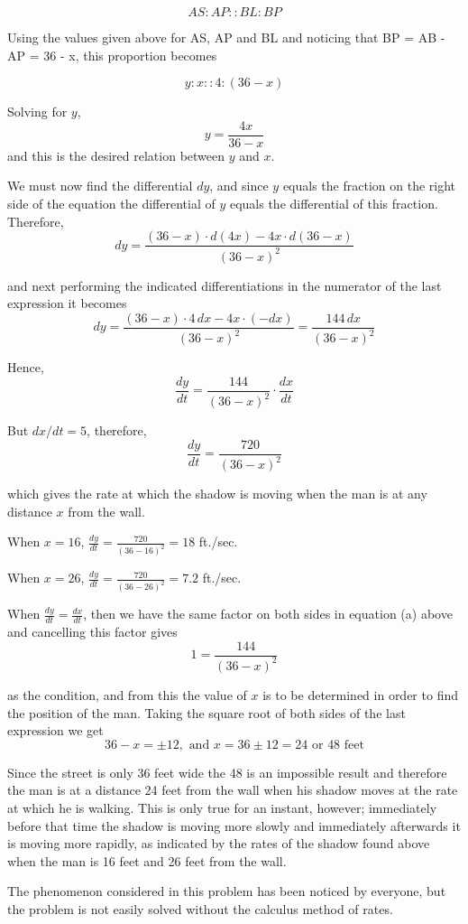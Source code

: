 \[AS : AP :: BL : BP\]

Using the values given above for AS, AP and BL and noticing that BP = AB - AP = 36 - x, this proportion becomes

\[y : x :: 4 : (36-x)\]

Solving for $y$,
\[y = \frac{4x}{36-x}\]
and this is the desired relation between $y$ and $x$.

We must now find the differential $dy$, and since $y$ equals the fraction on the right side of the equation the differential of $y$ equals the differential of this fraction. Therefore,
\[dy = \frac{(36-x)\cdot d(4x) - 4x\cdot d(36-x)}{(36-x)^2}\]

and next performing the indicated differentiations in the numerator of the last expression it becomes
\[dy = \frac{(36-x)\cdot 4\,dx - 4x\cdot(-dx)}{(36-x)^2} = \frac{144\,dx}{(36-x)^2}\]

Hence,
\[\frac{dy}{dt} = \frac{144}{(36-x)^2}\cdot\frac{dx}{dt}\]

But $dx/dt = 5$, therefore,
\[\frac{dy}{dt} = \frac{720}{(36-x)^2} \tag{a}\]

which gives the rate at which the shadow is moving when the man is at any distance $x$ from the wall.

When $x = 16$, $\frac{dy}{dt} = \frac{720}{(36-16)^2} = 18$ ft./sec.

When $x = 26$, $\frac{dy}{dt} = \frac{720}{(36-26)^2} = 7.2$ ft./sec.

When $\frac{dy}{dt} = \frac{dx}{dt}$, then we have the same factor on both sides in equation (a) above and cancelling this factor gives
\[1 = \frac{144}{(36-x)^2}\]

as the condition, and from this the value of $x$ is to be determined in order to find the position of the man. Taking the square root of both sides of the last expression we get
\[36-x = \pm 12, \text{ and } x = 36 \pm 12 = 24 \text{ or } 48 \text{ feet}\]

Since the street is only 36 feet wide the 48 is an impossible result and therefore the man is at a distance 24 feet from the wall when his shadow moves at the rate at which he is walking. This is only true for an instant, however; immediately before that time the shadow is moving more slowly and immediately afterwards it is moving more rapidly, as indicated by the rates of the shadow found above when the man is 16 feet and 26 feet from the wall.

The phenomenon considered in this problem has been noticed by everyone, but the problem is not easily solved without the calculus method of rates.

